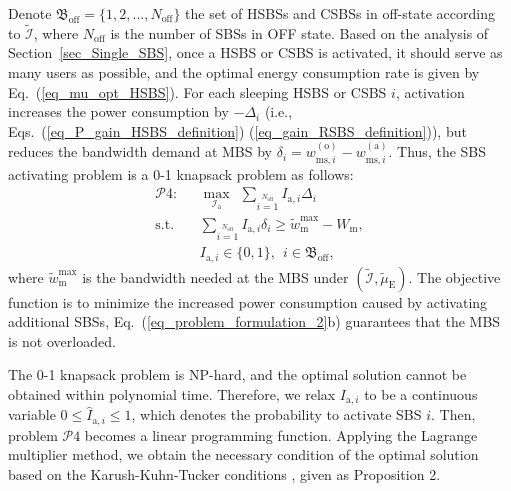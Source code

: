 \documentclass[12pt, draftclsnofoot,onecolumn]{IEEEtran}
\begin{document}
Denote $\mathfrak{B}_\mathrm{off}=\{1,2,...,N_\mathrm{off}\}$ the set of HSBSs and CSBSs in off-state according to $\tilde{\mathcal{I}}$, where $N_\mathrm{off}$ is the number of SBSs in OFF state.
Based on the analysis of Section~\ref{sec_Single_SBS}, once a HSBS or CSBS is activated, it should serve as many users as possible, and the optimal energy consumption rate is given by Eq.~(\ref{eq_mu_opt_HSBS}).
For each sleeping HSBS or CSBS $i$, activation increases the power consumption by $-\Delta_{i}$ (i.e., Eqs.~(\ref{eq_P_gain_HSBS_definition}) (\ref{eq_gain_RSBS_definition})), but reduces the bandwidth demand at MBS by $\delta_{i}= w_{\mathrm{ms},i}^{(\mathrm{o})}-w_{\mathrm{ms},i}^{(\mathrm{a})}$.
Thus, the SBS activating problem is a 0-1 knapsack problem as follows:
\begin{subequations}\label{eq_problem_formulation_2}
    \begin{align}
    \mathcal{P}4:~~~& \max\limits_{\mathcal{I}_\mathrm{a}} ~~\sum\limits_{i=1}\limits^{N_\mathrm{off}} I_{\mathrm{a},i} \Delta_{i}\\
    \mathrm{s.t.}~~~ & \sum\limits_{i=1}\limits^{N_\mathrm{off}} I_{\mathrm{a},i} \delta_{i} \geq \tilde{w}_\mathrm{m}^{\max}  - W_\mathrm{m},\\
                & I_{\mathrm{a},i} \in \{0,1\},~~i\in\mathfrak{B}_\mathrm{off},
    \end{align}
\end{subequations}
where $\tilde{w}_\mathrm{m}^{\max}$ is the bandwidth needed at the MBS under $(\tilde{\mathcal{I}},\tilde{\mu}_\mathrm{E})$.
The objective function is to minimize the increased power consumption caused by activating additional SBSs, Eq.~(\ref{eq_problem_formulation_2}b) guarantees that the MBS is not overloaded.

The 0-1 knapsack problem is NP-hard, and the optimal solution cannot be obtained within polynomial time.
Therefore, we relax $I_{\mathrm{a},i}$ to be a continuous variable $0 \leq \hat{I}_{\mathrm{a},i} \leq 1$, which denotes the probability to activate SBS $i$.
Then, problem $\mathcal{P}4$ becomes a linear programming function.
Applying the Lagrange multiplier method, we obtain the necessary condition of the optimal solution based on the Karush-Kuhn-Tucker conditions \cite{convex_optimization}, given as Proposition 2.
\end{document}

